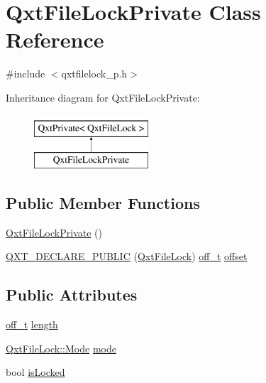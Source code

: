 \hypertarget{class_qxt_file_lock_private}{\section{Qxt\-File\-Lock\-Private Class Reference}
\label{class_qxt_file_lock_private}
}


{\ttfamily \#include $<$qxtfilelock\-\_\-p.\-h$>$}

Inheritance diagram for Qxt\-File\-Lock\-Private\-:\begin{figure}[H]
\begin{center}
\leavevmode
\includegraphics[height=2.000000cm]{class_qxt_file_lock_private}
\end{center}
\end{figure}
\subsection*{Public Member Functions}
\begin{DoxyCompactItemize}
\item 
\hyperlink{class_qxt_file_lock_private_a3102d4bb0e84db1d564b719d10a413d6}{Qxt\-File\-Lock\-Private} ()
\item 
\hyperlink{class_qxt_file_lock_private_a63e4025e9d0967ddbaff9231a74c2955}{Q\-X\-T\-\_\-\-D\-E\-C\-L\-A\-R\-E\-\_\-\-P\-U\-B\-L\-I\-C} (\hyperlink{class_qxt_file_lock}{Qxt\-File\-Lock}) \hyperlink{qxtfilelock_8h_af83497edef361523a95b06deda0b4c2d}{off\-\_\-t} \hyperlink{glext_8h_ae1b92ae085ddef4b1cdca7d749339fb0}{offset}
\end{DoxyCompactItemize}
\subsection*{Public Attributes}
\begin{DoxyCompactItemize}
\item 
\hyperlink{qxtfilelock_8h_af83497edef361523a95b06deda0b4c2d}{off\-\_\-t} \hyperlink{class_qxt_file_lock_private_ada407fd4e2da4ec1b70c023980976a6f}{length}
\item 
\hyperlink{class_qxt_file_lock_a98ad3e1055038fd611ad64755f794835}{Qxt\-File\-Lock\-::\-Mode} \hyperlink{class_qxt_file_lock_private_a78778fc13decc34cfad023ea406851e0}{mode}
\item 
bool \hyperlink{class_qxt_file_lock_private_af419101912835e8ed5116675da869b0f}{is\-Locked}
\end{DoxyCompactItemize}
